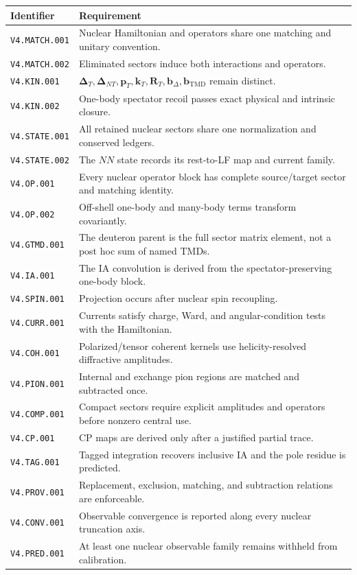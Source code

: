 \documentclass[11pt]{article}
\newcommand{\kT}{\bm{k}_{T}}
\newcommand{\pT}{\bm{p}_{T}}
\newcommand{\DT}{\bm{\Delta}_{T}}
\newcommand{\DNT}{\bm{\Delta}_{N T}}
\newcommand{\bD}{\bm{b}_{\Delta}}
\newcommand{\bM}{\bm{b}_{\mathrm{TMD}}}
\newcommand{\RT}{\bm{R}_{T}}
\begin{document}
\begin{longtable}{L{0.19\textwidth}L{0.71\textwidth}}
\toprule
Identifier & Requirement\\
\midrule
\endhead
\texttt{V4.MATCH.001} & Nuclear Hamiltonian and operators share one matching
and unitary convention.\\
\texttt{V4.MATCH.002} & Eliminated sectors induce both interactions and
operators.\\
\texttt{V4.KIN.001} & \(\DT,\DNT,\pT,\kT,\RT,\bD,\bM\) remain distinct.\\
\texttt{V4.KIN.002} & One-body spectator recoil passes exact physical and
intrinsic closure.\\
\texttt{V4.STATE.001} & All retained nuclear sectors share one normalization
and conserved ledgers.\\
\texttt{V4.STATE.002} & The \(NN\) state records its rest-to-LF map and
current family.\\
\texttt{V4.OP.001} & Every nuclear operator block has complete source/target
sector and matching identity.\\
\texttt{V4.OP.002} & Off-shell one-body and many-body terms transform
covariantly.\\
\texttt{V4.GTMD.001} & The deuteron parent is the full sector matrix element,
not a post hoc sum of named TMDs.\\
\texttt{V4.IA.001} & The IA convolution is derived from the spectator-preserving
one-body block.\\
\texttt{V4.SPIN.001} & Projection occurs after nuclear spin recoupling.\\
\texttt{V4.CURR.001} & Currents satisfy charge, Ward, and angular-condition
tests with the Hamiltonian.\\
\texttt{V4.COH.001} & Polarized/tensor coherent kernels use helicity-resolved
diffractive amplitudes.\\
\texttt{V4.PION.001} & Internal and exchange pion regions are matched and
subtracted once.\\
\texttt{V4.COMP.001} & Compact sectors require explicit amplitudes and
operators before nonzero central use.\\
\texttt{V4.CP.001} & CP maps are derived only after a justified partial trace.\\
\texttt{V4.TAG.001} & Tagged integration recovers inclusive IA and the pole
residue is predicted.\\
\texttt{V4.PROV.001} & Replacement, exclusion, matching, and subtraction
relations are enforceable.\\
\texttt{V4.CONV.001} & Observable convergence is reported along every nuclear
truncation axis.\\
\texttt{V4.PRED.001} & At least one nuclear observable family remains withheld
from calibration.\\
\bottomrule
\end{longtable}
\end{document}
